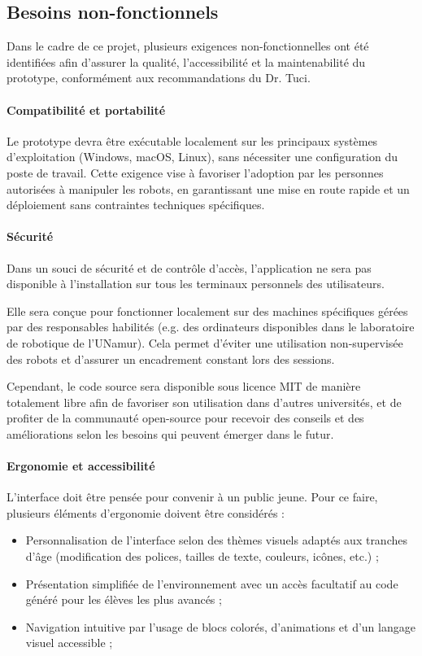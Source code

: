 \subsection{Besoins non-fonctionnels} \label{sec:non-functional_specs}

Dans le cadre de ce projet, plusieurs exigences non-fonctionnelles ont été identifiées afin d’assurer la qualité, l’accessibilité et la maintenabilité du prototype, conformément aux recommandations du Dr. Tuci.

\paragraph{Compatibilité et portabilité}
Le prototype devra être exécutable localement sur les principaux systèmes d’exploitation (Windows, macOS, Linux), sans nécessiter une configuration du poste de travail. 
Cette exigence vise à favoriser l’adoption par les personnes autorisées à manipuler les robots, en garantissant une mise en route rapide et un déploiement sans contraintes techniques spécifiques.

\paragraph{Sécurité}
Dans un souci de sécurité et de contrôle d’accès, l’application ne sera pas disponible à l'installation sur tous les terminaux personnels des utilisateurs.

Elle sera conçue pour fonctionner localement sur des machines spécifiques gérées par des responsables habilités (e.g. des ordinateurs disponibles dans le laboratoire de robotique de l'UNamur).
Cela permet d’éviter une utilisation non-supervisée des robots et d’assurer un encadrement constant lors des sessions.

Cependant, le code source sera disponible sous licence MIT de manière totalement libre afin de favoriser son utilisation dans d'autres universités, et de profiter de la communauté open-source pour recevoir des conseils et des améliorations selon les besoins qui peuvent émerger dans le futur.

\paragraph{Ergonomie et accessibilité}
L’interface doit être pensée pour convenir à un public jeune.
Pour ce faire, plusieurs éléments d’ergonomie doivent être considérés :
\begin{itemize}
    \item Personnalisation de l’interface selon des thèmes visuels adaptés aux tranches d’âge (modification des polices, tailles de texte, couleurs, icônes, etc.) ;
    
    \item Présentation simplifiée de l’environnement avec un accès facultatif au code généré pour les élèves les plus avancés ;
    
    \item Navigation intuitive par l’usage de blocs colorés, d’animations et d’un langage visuel accessible ;
\end{itemize}

